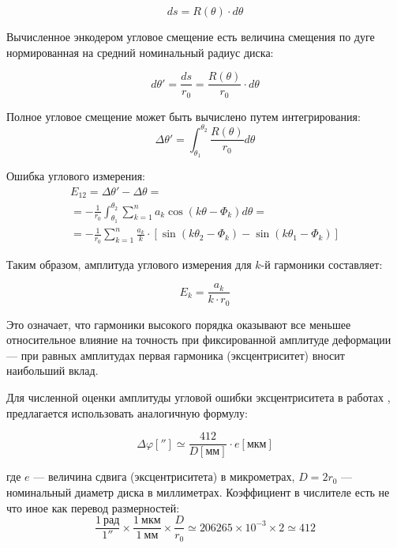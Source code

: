 \begin{equation*}
    ds = R(\theta)\cdot d\theta
\end{equation*}

Вычисленное энкодером угловое смещение есть величина смещения по дуге нормированная на средний номинальный радиус диска:

\begin{equation*}
    d\theta' = \frac{ds}{r_0} = \frac{R(\theta)}{r_0}\cdot d\theta
\end{equation*}

Полное угловое смещение может быть вычислено путем интегрирования:
\begin{equation*}
    \Delta \theta' = \int_{\theta_1}^{\theta_2}{\frac{R(\theta)}{r_0}d\theta}
\end{equation*}

Ошибка углового измерения:
\begin{multline*}
    E_{12} = \Delta \theta' - \Delta \theta = \\=-\frac{1}{r_0}\int_{\theta_1}^{\theta_2}{\sum_{k=1}^{n}{a_k\cos(k\theta-\Phi_k)}d\theta} = \\
    =-\frac{1}{r_0}\sum_{k=1}^{n}\frac{a_k}{k}\cdot\left[\sin(k\theta_2-\Phi_k)-\sin(k\theta_1-\Phi_k)\right]
\end{multline*}

Таким образом, амплитуда углового измерения для $k$-й гармоники составляет:

\begin{equation*}
    E_k = \frac{a_k}{k\cdot r_0}
\end{equation*}

Это означает, что гармоники высокого порядка оказывают все меньшее относительное влияние на точность при фиксированной амплитуде деформации --- при равных амплитудах первая гармоника (эксцентриситет) вносит наибольший вклад.

Для численной оценки амплитуды угловой ошибки эксцентриситета в работах \cite{eccentricity_error}, \cite{heidenhain-modular-angle-encoders} предлагается использовать аналогичную формулу:

\begin{equation*}
    \Delta \varphi[''] \simeq \frac{412}{D[\text{мм}]}\cdot e[\text{мкм}]
\end{equation*}

где $e$ --- величина сдвига (эксцентриситета) в микрометрах, $D = 2r_0$ --- номинальный диаметр диска в миллиметрах. Коэффициент в числителе есть не что иное как перевод размерностей:
$$
\frac{1~\text{рад}}{1''} \times \frac{1~\text{мкм}}{1~\text{мм}}\times\frac{D}{r_0}  \simeq 206265 \times 10^{-3}\times2 \simeq 412
$$


